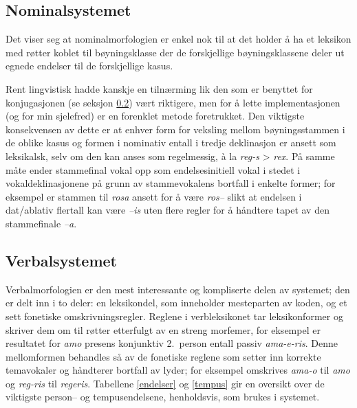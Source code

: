 \documentclass{article}
\begin{document}

\subsection{Nominalsystemet}
Det viser seg at nominalmorfologien er enkel nok til at det holder \aa{} ha et
leksikon med r\o{}tter koblet til b\o{}yningsklasse der de forskjellige
b\o{}yningsklassene deler ut egnede endelser til de forskjellige kasus.

Rent lingvistisk hadde kanskje en tiln\ae{}rming lik den som er benyttet for
konjugasjonen (se seksjon \ref{conjugation}) v\ae{}rt riktigere, men for \aa{}
lette implementasjonen (og for min sjelefred) er en forenklet metode
foretrukket. Den viktigste konsekvensen av dette er at enhver form for
veksling mellom b\o{}yningsstammen i de oblike kasus og formen i nominativ
entall i tredje deklinasjon er ansett som leksikalsk, selv om den kan anses
som regelmessig, \`a la \emph{reg-s} > \emph{rex}. P\aa{} samme m\aa{}te ender
stammefinal vokal opp som endelsesinitiell vokal i stedet i
vokaldeklinasjonene p\aa{} grunn av stammevokalens bortfall i enkelte former;
for eksempel er stammen til \emph{rosa} ansett for \aa{} v\ae{}re \emph{ros--}
slikt at endelsen i dat/ablativ flertall kan v\ae{}re \emph{--is} uten flere
regler for \aa{} h\aa{}ndtere tapet av den stammefinale \emph{--a}.

\subsection{Verbalsystemet}
\label{conjugation}
Verbalmorfologien er den mest interessante og kompliserte delen av systemet;
den er delt inn i to deler: en leksikondel, som inneholder mesteparten av
koden, og et sett fonetiske omskrivningsregler. Reglene i verbleksikonet tar
leksikonformer og skriver dem om til r\o{}tter etterfulgt av en streng
morfemer, for eksempel er resultatet for \emph{amo} presens konjunktiv
2.~person entall passiv \emph{ama-e-ris}. Denne mellomformen behandles s\aa{}
av de fonetiske reglene som setter inn korrekte temavokaler og h\aa{}ndterer
bortfall av lyder; for eksempel omskrives \emph{ama-o} til \emph{amo} og
\emph{reg-ris} til \emph{regeris}. Tabellene \ref{endelser} og \ref{tempus}
gir en oversikt over de viktigste person-- og tempusendelsene, henholdsvis,
som brukes i systemet.
\end{document}
